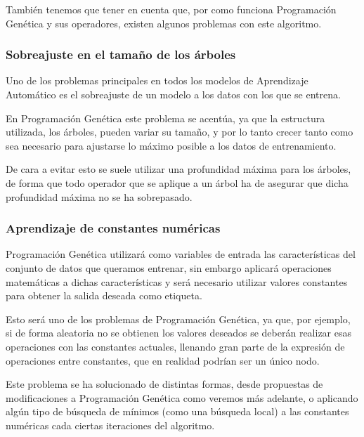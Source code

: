 También tenemos que tener en cuenta que, por como funciona Programación Genética y sus operadores, existen algunos problemas con este algoritmo.

\subsubsection{Sobreajuste en el tamaño de los árboles}

Uno de los problemas principales en todos los modelos de Aprendizaje Automático es el sobreajuste de un modelo a los datos con los que se entrena.

En Programación Genética este problema se acentúa, ya que la estructura utilizada, los árboles, pueden variar su tamaño, y por lo tanto crecer tanto como sea necesario para ajustarse lo máximo posible a los datos de entrenamiento.

De cara a evitar esto se suele utilizar una profundidad máxima para los árboles, de forma que todo operador que se aplique a un árbol ha de asegurar que dicha profundidad máxima no se ha sobrepasado.

\subsubsection{Aprendizaje de constantes numéricas}

Programación Genética utilizará como variables de entrada las características del conjunto de datos que queramos entrenar, sin embargo aplicará operaciones matemáticas a dichas características y será necesario utilizar valores constantes para obtener la salida deseada como etiqueta.

Esto será uno de los problemas de Programación Genética, ya que, por ejemplo, si de forma aleatoria no se obtienen los valores deseados se deberán realizar esas operaciones con las constantes actuales, llenando gran parte de la expresión de operaciones entre constantes, que en realidad podrían ser un único nodo.

Este problema se ha solucionado de distintas formas, desde propuestas de modificaciones a Programación Genética como veremos más adelante, o aplicando algún tipo de búsqueda de mínimos (como una búsqueda local) a las constantes numéricas cada ciertas iteraciones del algoritmo.


\newpage
